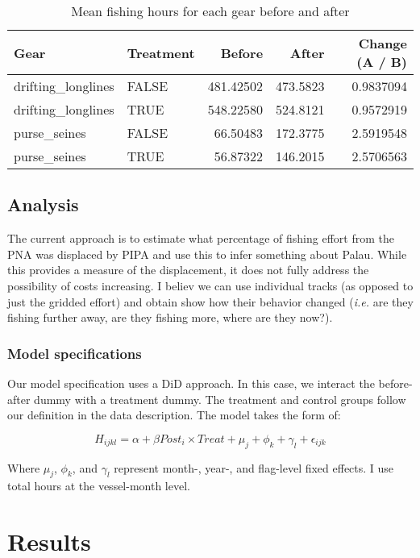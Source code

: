 \documentclass[]{article}
\theoremstyle{definition}
\theoremstyle{definition}
\theoremstyle{definition}
\theoremstyle{remark}
\begin{document}
\begin{table}[H]

\caption{\label{tab:unnamed-chunk-6}\label{tab:baci_h}Mean fishing hours for each gear before and after}
\centering
\begin{tabular}[t]{llrrr}
\toprule
Gear & Treatment & Before & After & Change (A / B)\\
\midrule
drifting\_longlines & FALSE & 481.42502 & 473.5823 & 0.9837094\\
drifting\_longlines & TRUE & 548.22580 & 524.8121 & 0.9572919\\
purse\_seines & FALSE & 66.50483 & 172.3775 & 2.5919548\\
purse\_seines & TRUE & 56.87322 & 146.2015 & 2.5706563\\
\bottomrule
\end{tabular}
\end{table}

\subsection{Analysis}\label{analysis}

The current approach is to estimate what percentage of fishing effort
from the PNA was displaced by PIPA and use this to infer something about
Palau. While this provides a measure of the displacement, it does not
fully address the possibility of costs increasing. I believ we can use
individual tracks (as opposed to just the gridded effort) and obtain
show how their behavior changed (\emph{i.e.} are they fishing further
away, are they fishing more, where are they now?).

\subsubsection{Model specifications}\label{model-specifications}

Our model specification uses a DiD approach. In this case, we interact
the before-after dummy with a treatment dummy. The treatment and control
groups follow our definition in the data description. The model takes
the form of:

\[
H_{ijkl} = \alpha + \beta Post_i \times Treat + \mu_j + \phi_k + \gamma_l+ \epsilon_{ijk}
\]

Where \(\mu_j\), \(\phi_k\), and \(\gamma_l\) represent month-, year-,
and flag-level fixed effects. I use total hours at the vessel-month
level.

\section{Results}\label{results}
\end{document}
